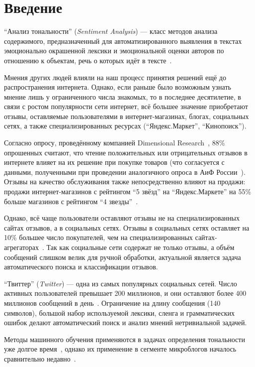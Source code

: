 \section*{Введение}

``Анализ тональности'' (\textit{Sentiment Analysis}) ---  класс методов анализа содержимого, предназначенный для автоматизированного выявления в текстах эмоционально окрашенной лексики и эмоциональной оценки авторов по отношению  к объектам, речь о которых идёт в тексте~\cite{wikisent}. 

Мнения других людей влияли на наш процесс принятия решений ещё до распространения интернета. Однако, если раньше было возможным узнать мнение лишь у ограниченного числа знакомых, то в последнее десятилетие, в связи с ростом популярности сети интернет, всё большее значение приобретают отзывы, оставляемые пользователями в интернет-магазинах, блогах, социальных сетях, а также специализированных ресурсах (``Яндекс.Маркет'', ``Кинопоиск''). 

Согласно опросу, проведённому компанией Dimensional Research~\cite{dimresearch}, 88\% опрошенных считают, что чтение положительных или отрицательных отзывов в интернете влияет на их решение при покупке товаров (что согласуется с данными, полученными при проведении аналогичного опроса в АиФ России~\cite{aif}). Отзывы на качество обслуживания также непосредственно влияют на продажи: продажи интернет-магазинов с рейтингом ``5 звёзд'' на ``Яндекс.Маркете'' на 55\% больше магазинов с рейтингом ``4 звезды''~\cite{medianation}.

Однако, всё чаще пользователи оставляют отзывы не на специализированных сайтах отзывов, а в социальных сетях. Отзывы в социальных сетях оставляет на 10\% большее число покупателей, чем на специализированных сайтах-агрегаторах~\cite{dimresearch}. Так как социальные сети содержат не только отзывы, а объём сообщений слишком велик для ручной обработки, актуальной является задача автоматического поиска и классификации отзывов.
 
 ``Твиттер'' (\textit{Twitter}) --- одна из самых популярных социальных сетей. Число активных пользователей превышает 200 миллионов, и они оставляют более 400 миллионов сообщений в день~\cite{twitter_users}. Ограничение на длину сообщения (140 символов), большой набор используемой лексики, сленга и грамматических ошибок делают автоматический поиск и анализ мнений нетривиальной задачей.

 Методы машинного обучения применяются в задачах определения тональности уже долгое время~\cite{panglee}, однако их применение в сегменте микроблогов началось сравнительно недавно~\cite{distsuperv}.

